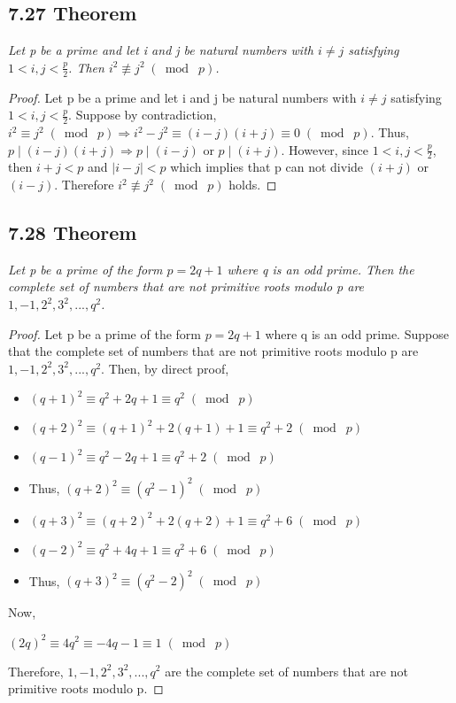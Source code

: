\documentclass{article}
\begin{document}
\subsection*{7.27 Theorem} 
\quad \textit{Let p be a prime and let i and j be natural numbers with $i \neq j$ satisfying $1 < i,j < \frac{p}{2}$. Then $i^2 \not\equiv j^2 \;(\bmod\; p)$.}

\begin{proof}
Let p be a prime and let i and j be natural numbers with $i \neq j$ satisfying $1 < i,j < \frac{p}{2}$. Suppose by contradiction, $i^2 \equiv j^2 \;(\bmod\; p) \Longrightarrow i^2 - j^2 \equiv (i-j)(i+j) \equiv 0\;(\bmod\; p)$. Thus, $p \mid (i-j)(i+j) \Longrightarrow p \mid (i-j)$ or $p \mid (i+j)$. However, since $1 < i,j < \frac{p}{2}$, then $i+j < p$ and $|i-j| < p$ which implies that p can not divide $(i+j)$ or $(i-j)$. Therefore $i^2 \not\equiv j^2 \;(\bmod\; p)$ holds.
\end{proof}

\subsection*{7.28 Theorem} 
\quad \textit{Let p be a prime of the form $p=2q+1$ where q is an odd prime. Then the complete set of numbers that are not primitive roots modulo p are $1,-1,2^2,3^2,...,q^2$.}

\begin{proof}
Let p be a prime of the form $p=2q+1$ where q is an odd prime. Suppose that the complete set of numbers that are not primitive roots modulo p are $1,-1,2^2,3^2,...,q^2$. Then, by direct proof,
\begin{itemize}
    \item $(q+1)^2 \equiv q^2 + 2q + 1 \equiv q^2 \;(\bmod\; p)$
    \item $(q+2)^2 \equiv (q+1)^2 + 2(q+1) + 1 \equiv q^2 + 2 \;(\bmod\; p)$
    \item $(q-1)^2 \equiv q^2 - 2q + 1 \equiv q^2 + 2 \;(\bmod\; p)$
    \item Thus, $(q+2)^2 \equiv (q^2-1)^2 \;(\bmod\; p)$
    \item $(q+3)^2 \equiv (q+2)^2 + 2(q+2) + 1 \equiv q^2+6 \;(\bmod\; p)$
    \item $(q-2)^2 \equiv q^2 + 4q + 1 \equiv q^2+6 \;(\bmod\; p)$
    \item Thus, $(q+3)^2 \equiv (q^2-2)^2 \;(\bmod\; p)$
\end{itemize}
Now,
\begin{center}
    $(2q)^2 \equiv 4q^2 \equiv -4q-1 \equiv 1 \;(\bmod\; p)$
\end{center}
Therefore,  $1,-1,2^2,3^2,...,q^2$ are the complete set of numbers that are not primitive roots modulo p.
\end{proof}
\end{document}
